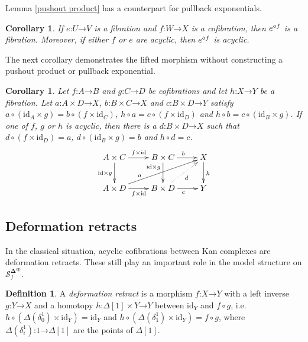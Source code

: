 \documentclass{amsart}
\theoremstyle{plain}
\newtheorem{corol}[theorem]{Corollary}
\theoremstyle{definition}
\newtheorem{defin}[theorem]{Definition}
\newcommand\hide[1]{}
\newcommand\cat\mathcal
\newcommand\id{\mathrm{id}}
\newcommand\dual{^{\mathrm{op}}}
\newcommand\simCat{\mathbf\Delta}
\newcommand\s{^{\simCat\dual}}
\newcommand\of{\mathord:}
\renewcommand\to{\mathord\rightarrow}
\newcommand\simplex\Delta
\newcommand\f{_f}
\begin{document}
Lemma \ref{pushout product} has a counterpart for pullback exponentials.

\begin{corol} If $e\of U\to V$ is a fibration and $f\of W\to X$ is a cofibration, then $e^{\diamond f}$ is a fibration. Moreover, if either $f$ or $e$ are acyclic, then $e^{\diamond f}$ is acyclic. \label{pullback exponential}
\end{corol}

The next corollary demonstrates the lifted morphism without constructing a pushout product or pullback exponential.

\begin{corol} Let $f\of A\to B$ and $g\of C\to D$ be cofibrations and let $h\of X\to Y$ be a fibration. Let $a\of A\times D\to X$, $b\of B\times C\to X$ and $c\of B \times D\to Y$ satisfy $a\circ(\id_A\times g) = b\circ(f\times \id_C)$, $h\circ a=c\circ(f\times \id_D)$ and $h\circ b=c\circ(\id_B\times g)$. If one of $f$, $g$ or $h$ is acyclic, then there is a $d\of B\times D\to X$ such that $d\circ(f\times\id_D)=a$, $d\circ(\id_B\times g)=b$ and $h\circ d = c$.
\[\xymatrix{
A\times C\ar[r]^{f\times \id}\ar[d]_{\id\times g} & B\times C\ar[r]^b\ar[d]_(.3){\id\times g} & X\ar[d]^h\\
A\times D\ar[r]_{f\times \id} \ar[urr]^(.3){a} & B\times D \ar[r]_c \ar@{.>}[ur]_{d} & Y
}\]
\hide{Transposed view:
\[\xymatrix{
A\ar[r]^{a^t}\ar[d]_f & X^D\ar[r]^{X^g}\ar[d]^(.7){h^D} & X^C\ar[d]^{h^C}\\
B\ar[r]_{c^t} \ar[urr]_(.7){b^t} \ar@{.>}[ur]^{d^t} & Y^D \ar[r]_{Y^g} & Y^C
}\]}\label{triple lift}
\end{corol}


\subsection{Deformation retracts}
In the classical situation, acyclic cofibrations between Kan complexes are deformation retracts. These still play an important role in the model structure on $\cat S\s\f$.

\begin{defin} A \emph{deformation retract} is a morphism $f\of X\to Y$ with a left inverse $g\of Y\to X$ and a homotopy $h\of \simplex[1]\times Y\to Y$ between $\id_Y$ and $f\circ g$, i.e.\ $h\circ (\Delta(\delta^1_0)\times \id_Y) = \id_Y$ and $h\circ (\Delta(\delta^1_1)\times \id_Y) = f\circ g$, where $\Delta(\delta^1_i)\of 1\to \simplex[1]$ are the points of $\simplex[1]$.
\end{defin}
\end{document}
